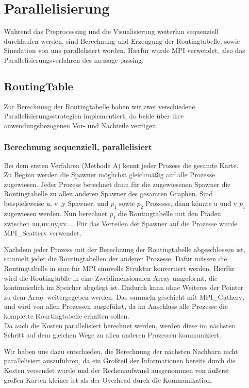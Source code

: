 \documentclass[paper=A4,pagesize=auto,12pt,headinclude=true,footinclude=true,BCOR=0mm,DIV=calc]{scrartcl}
\begin{document}
	\section{Parallelisierung}
	Während das Preprocessing und die Visualisierung weiterhin sequenziell durchlaufen werden, sind Berechnung und Erzeugung der Routingtabelle, sowie Simulation von uns parallelisiert worden. Hierfür wurde MPI verwendet, also das Parallelisierungsverfahren des message passing.
	\subsection{RoutingTable}
	Zur Berechnung der Routingtabelle haben wir zwei verschiedene Parallelisierungsstrategien implementiert, da beide über ihre anwendungsbezogenen Vor- und Nachteile verfügen.
	\subsubsection{Berechnung sequenziell, parallelisiert}
	Bei dem ersten Verfahren (Methode A) kennt jeder Prozess die gesamte Karte. Zu Beginn werden die Spawner möglichst gleichmäßig auf alle Prozesse zugewiesen. Jeder Prozess berechnet dann für die zugewiesenen Spawner die Routingtabelle zu allen anderen Spawner des gesamten Graphen. Sind beispielsweise u, v ,y Spawner, und $p_{1}$ sowie $p_{2}$ Prozesse, dann könnte u und v $p_{1}$ zugewiesen werden. Nun berechnet  $p_{1}$ die Routingtabelle mit den Pfaden zwischen uu,uv,uy,vv....
	Für das Verteilen der Spawner auf die Prozesse wurde MPI\_Scatterv verwendet.
	
	Nachdem jeder Prozess mit der Berechnung der Routingtabelle abgeschlossen ist, sammelt jeder die Routingtabellen der anderen Prozesse. Dafür müssen die Routingtabelle in eine für MPI sinnvolle Struktur konvertiert werden. Hierfür wird die Routingtablle in eine Zweidimensionalen Array umgeformt, die kontinuierlich im Speicher abgelegt ist. Dadurch kann ohne Weiteres der Pointer zu dem Array weitergegeben werden. Das sammeln geschieht mit MPI\_Gatherv, und wird von allen Prozessen ausgeführt, da im Anschluss alle Prozesse die komplette Rourtingtabelle erhalten sollen.\\
	Da auch die Kosten parallelisiert berechnet werden, werden diese im nächsten Schritt auf dem gleichen Wege zu allen anderen Prozessen kommuniziert. 
	
	
	Wir haben uns dazu entschieden, die Berechnung der nächsten Nachbarn nicht parallelisiert auszuführen, da ein Großteil der Informationen bereits durch die Kosten versendet wurde und der Rechenaufwand ausgenommen von äußerst großen Karten kleiner ist als der Overhead durch die Kommunikation.
	
\end{document}
